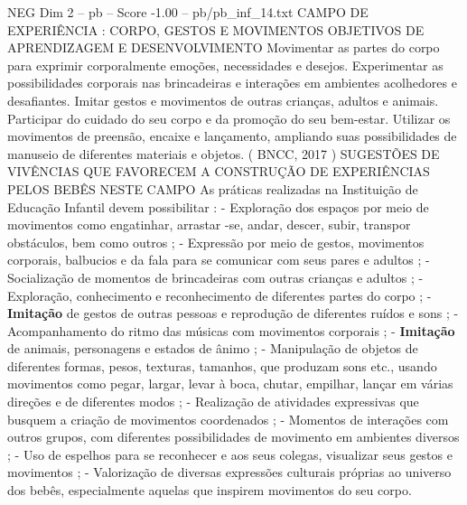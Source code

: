\begin{textsample}{NEG Dim 2 – pb – Score -1.00 – pb/pb\_inf\_14.txt}  \label{ex:f2_neg_018}
CAMPO DE EXPERIÊNCIA : CORPO, GESTOS E MOVIMENTOS OBJETIVOS DE APRENDIZAGEM E DESENVOLVIMENTO Movimentar as partes do corpo para exprimir corporalmente emoções, necessidades e desejos.
Experimentar as possibilidades corporais nas brincadeiras e interações em ambientes acolhedores e desafiantes.
Imitar gestos e movimentos de outras crianças, adultos e animais.
Participar do cuidado do seu corpo e da promoção do seu bem-estar.
Utilizar os movimentos de preensão, encaixe e lançamento, ampliando suas possibilidades de manuseio de diferentes materiais e objetos. ( BNCC, 2017 ) SUGESTÕES DE VIVÊNCIAS QUE FAVORECEM A CONSTRUÇÃO DE EXPERIÊNCIAS PELOS BEBÊS NESTE CAMPO As práticas realizadas na Instituição de Educação Infantil devem possibilitar : - Exploração dos espaços por meio de movimentos como engatinhar, arrastar -se, andar, descer, subir, transpor obstáculos, bem como outros ; - Expressão por meio de gestos, movimentos corporais, balbucios e da fala para se comunicar com seus pares e adultos ; - Socialização de momentos de brincadeiras com outras crianças e adultos ; - Exploração, conhecimento e reconhecimento de diferentes partes do corpo ; - \textbf{Imitação} de gestos de outras pessoas e reprodução de diferentes ruídos e sons ; - Acompanhamento do ritmo das músicas com movimentos corporais ; - \textbf{Imitação} de animais, personagens e estados de ânimo ; - Manipulação de objetos de diferentes formas, pesos, texturas, tamanhos, que produzam sons etc., usando movimentos como pegar, largar, levar à boca, chutar, empilhar, lançar em várias direções e de diferentes modos ; - Realização de atividades expressivas que busquem a criação de movimentos coordenados ; - Momentos de interações com outros grupos, com diferentes possibilidades de movimento em ambientes diversos ; - Uso de espelhos para se reconhecer e aos seus colegas, visualizar seus gestos e movimentos ; - Valorização de diversas expressões culturais próprias ao universo dos bebês, especialmente aquelas que inspirem movimentos do seu corpo.

\end{textsample}
